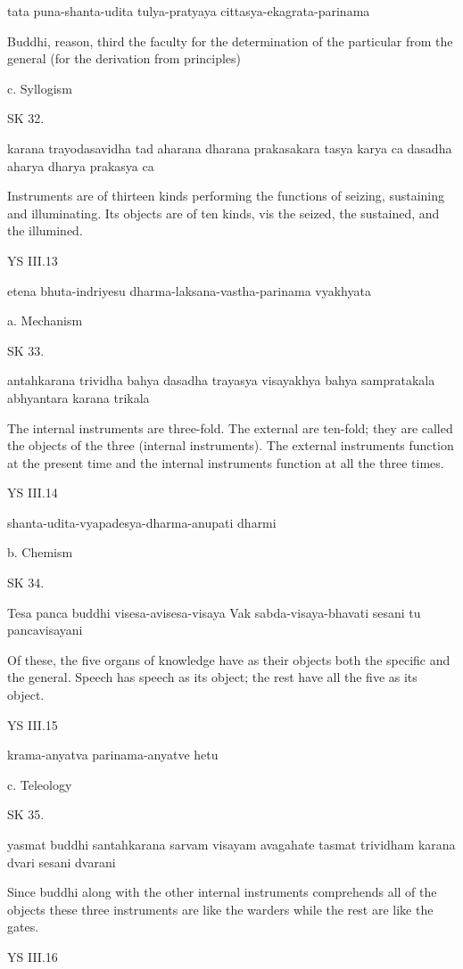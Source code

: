 tata puna-shanta-udita tulya-pratyaya cittasya-ekagrata-parinama

Buddhi, reason, third the faculty for the determination of
the particular from the general (for the derivation from principles)

c. Syllogism

SK 32.

karana trayodasavidha tad aharana dharana prakasakara
tasya karya ca dasadha aharya dharya prakasya ca

Instruments are of thirteen kinds performing the functions of
seizing, sustaining and illuminating.
Its objects are of ten kinds, vis
the seized, the sustained, and the illumined.

YS III.13

etena bhuta-indriyesu dharma-laksana-vastha-parinama vyakhyata

a. Mechanism

SK 33.

antahkarana trividha bahya dasadha trayasya visayakhya
bahya sampratakala abhyantara karana trikala

The internal instruments are three-fold.
The external are ten-fold;
they are called the objects of the three (internal instruments).
The external instruments function at the present time and
the internal instruments function at all the three times.

YS III.14

shanta-udita-vyapadesya-dharma-anupati dharmi

b. Chemism

SK 34.

Tesa panca buddhi visesa-avisesa-visaya
Vak sabda-visaya-bhavati sesani tu pancavisayani

Of these, the five organs of knowledge have as their objects
both the specific and the general.
Speech has speech as its object;
the rest have all the five as its object.

YS III.15

krama-anyatva parinama-anyatve hetu

c. Teleology

SK 35.

yasmat buddhi santahkarana sarvam visayam avagahate
tasmat trividham karana dvari sesani dvarani

Since buddhi along with the other internal instruments
comprehends all of the objects these three instruments are
like the warders while the rest are like the gates.

YS III.16

